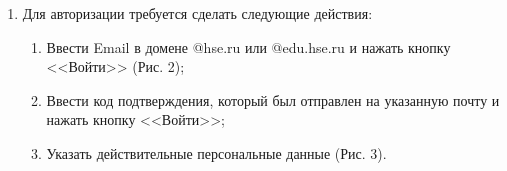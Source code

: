 \documentclass{../includes/TechDoc}
\begin{document}
\begin{enumerate}
        \newpage
        \item Для авторизации требуется сделать следующие действия:
        \begin{enumerate}
            \item Ввести Email в домене @hse.ru или @edu.hse.ru и нажать кнопку <<Войти>> (Рис. 2);
            \item Ввести код подтверждения, который был отправлен на указанную почту и нажать кнопку <<Войти>>;
            \item Указать действительные персональные данные (Рис. 3).
        \end{enumerate}
        \begin{figure}[h]
            \begin{center}
                \begin{minipage}[h]{0.4\linewidth}

\end{minipage}
\end{center}
\end{figure}
\end{enumerate}
\end{document}
